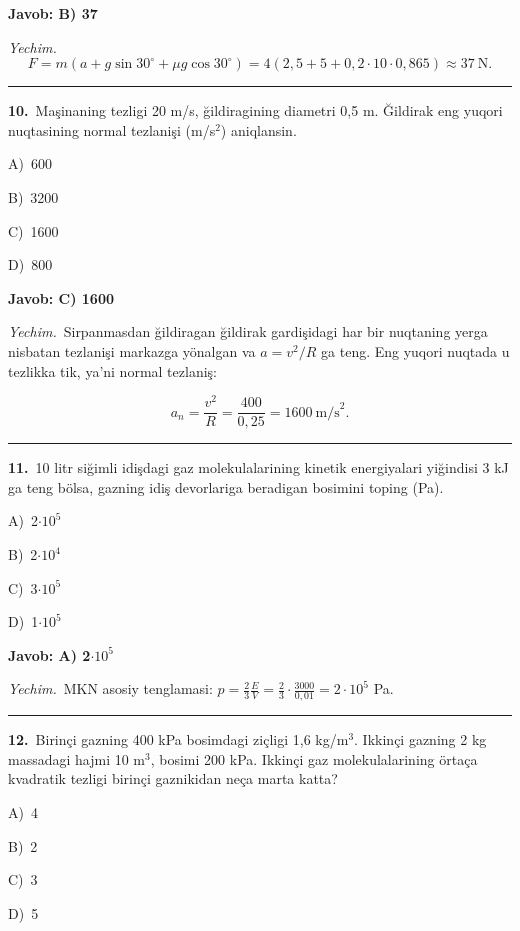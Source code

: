 \documentclass[11pt,a4paper]{article}
\newcommand{\opt}[2]{\hspace*{4mm}#1)\ #2\par}
\begin{document}
\noindent\colorbox{gray!12}{\parbox{\dimexpr\linewidth-2\fboxsep}{\textbf{Javob: B) 37}}}\par\smallskip
\noindent\textit{Yechim.}\ \[F=m\left(a+g\sin30^\circ+\mu g\cos30^\circ\right)=4\left(2{,}5+5+0{,}2\cdot10\cdot0{,}865\right)\approx37\ \text{N}.\]\par\medskip\hrule\medskip
{}\noindent\begin{minipage}{\linewidth}
\textbf{10.}\ Maşinaning tezligi 20 m/s, ğildiragining diametri 0,5 m. Ğildirak eng yuqori nuqtasining normal tezlanişi (m/s$^{2}$) aniqlansin.\par\smallskip
\opt{A}{600}
\opt{B}{3200}
\opt{C}{1600}
\opt{D}{800}
\end{minipage}\vspace{2pt}\par
\noindent\colorbox{gray!12}{\parbox{\dimexpr\linewidth-2\fboxsep}{\textbf{Javob: C) 1600}}}\par\smallskip
\noindent\textit{Yechim.}\ Sirpanmasdan ğildiragan ğildirak gardişidagi har bir nuqtaning yerga nisbatan tezlanişi markazga yönalgan va $a=v^2/R$ ga teng. Eng yuqori nuqtada u tezlikka tik, ya’ni normal tezlaniş:\par
\[a_n=\frac{v^2}{R}=\frac{400}{0{,}25}=1600\ \text{m/s}^2.\]\par\medskip\hrule\medskip
{}\noindent\begin{minipage}{\linewidth}
\textbf{11.}\ 10 litr siğimli idişdagi gaz molekulalarining kinetik energiyalari yiğindisi 3 kJ ga teng bölsa, gazning idiş devorlariga beradigan bosimini toping (Pa).\par\smallskip
\opt{A}{2$\cdot10^{5}$}
\opt{B}{2$\cdot10^{4}$}
\opt{C}{3$\cdot10^{5}$}
\opt{D}{1$\cdot10^{5}$}
\end{minipage}\vspace{2pt}\par
\noindent\colorbox{gray!12}{\parbox{\dimexpr\linewidth-2\fboxsep}{\textbf{Javob: A) 2$\cdot10^{5}$}}}\par\smallskip
\noindent\textit{Yechim.}\ MKN asosiy tenglamasi: $p=\frac23\frac{E}{V}=\frac23\cdot\frac{3000}{0{,}01}=2\cdot10^5$ Pa.\par\par\medskip\hrule\medskip
{}\noindent\begin{minipage}{\linewidth}
\textbf{12.}\ Birinçi gazning 400 kPa bosimdagi ziçligi 1,6 kg/m$^{3}$. Ikkinçi gazning 2 kg massadagi hajmi 10 m$^{3}$, bosimi 200 kPa. Ikkinçi gaz molekulalarining örtaça kvadratik tezligi birinçi gaznikidan neça marta katta?\par\smallskip
\opt{A}{4}
\opt{B}{2}
\opt{C}{3}
\opt{D}{5}
\end{minipage}\vspace{2pt}\par
\end{document}
